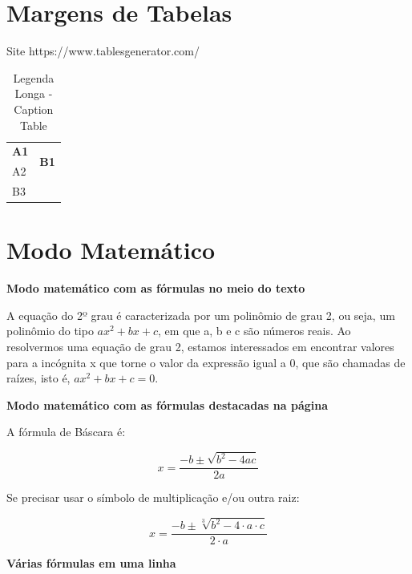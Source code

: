 \documentclass[12pt]{article}
\begin{document}
\newpage
\section{Margens de Tabelas}

Site https://www.tablesgenerator.com/

\renewcommand{\arraystretch}{1.5}
\begin{table}[H]
	\centering
	\caption[legenda curta]{Legenda Longa - Caption Table}
	\label{tab:Label Table}
	\begin{tabularx}{0.5\textwidth}{|X|X|X|}
		\hline
		\centering\textbf{A1} & \multicolumn{2}{c|}{\multirow{2}{*}{\textbf{B1}}}\\ \cline{1-1}
		A2          &  \multicolumn{2}{l|}{}          \\ \hline
		B3          &             &                   \\ \hline
	\end{tabularx}
\end{table}





\newpage
\section{Modo Matemático}

\textbf{Modo matemático com as fórmulas no meio do texto}

A equação do 2º grau é caracterizada por um polinômio de grau 2, ou seja, um polinômio do tipo $ax^2+bx+c$, em que a, b e c são números reais. Ao resolvermos uma equação de grau 2, estamos interessados em encontrar valores para a incógnita x que torne o valor da expressão igual a 0, que são chamadas de raízes, isto é, $ax^2 + bx +c = 0$.

\textbf{Modo matemático com as fórmulas destacadas na página}

A fórmula de Báscara é:

\begin{equation}
	x = \frac{-b \pm \sqrt{b^2 -4ac}}{2a}
\end{equation}

Se precisar usar o símbolo de multiplicação e/ou outra raiz:

\begin{equation}
	x = \frac{-b \pm \sqrt[3]{b^2 -4\cdot a\cdot c}}{2\cdot a}
\end{equation}

\textbf{Várias fórmulas em uma linha}
\end{document}
